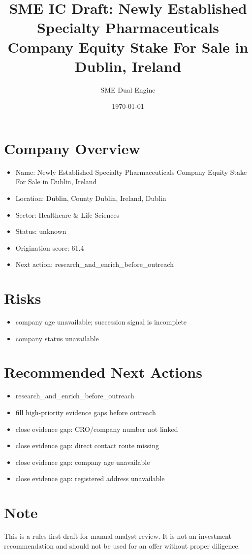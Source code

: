 \documentclass[11pt,a4paper]{article}
\title{SME IC Draft: Newly Established Specialty Pharmaceuticals Company Equity Stake For Sale in Dublin, Ireland}
\author{SME Dual Engine}
\date{\today}
\begin{document}
\maketitle
\section*{Company Overview}
\begin{itemize}[leftmargin=1.4em]
\item Name: Newly Established Specialty Pharmaceuticals Company Equity Stake For Sale in Dublin, Ireland
\item Location: Dublin, County Dublin, Ireland, Dublin
\item Sector: Healthcare \& Life Sciences
\item Status: unknown
\item Origination score: 61.4
\item Next action: research\_and\_enrich\_before\_outreach
\end{itemize}
\section*{Risks}
\begin{itemize}[leftmargin=1.4em]
\item company age unavailable; succession signal is incomplete
\item company status unavailable
\end{itemize}
\section*{Recommended Next Actions}
\begin{itemize}[leftmargin=1.4em]
\item research\_and\_enrich\_before\_outreach
\item fill high-priority evidence gaps before outreach
\item close evidence gap: CRO/company number not linked
\item close evidence gap: direct contact route missing
\item close evidence gap: company age unavailable
\item close evidence gap: registered address unavailable
\end{itemize}
\section*{Note}
This is a rules-first draft for manual analyst review. It is not an investment
recommendation and should not be used for an offer without proper diligence.
\end{document}
